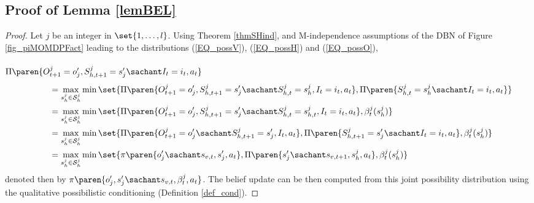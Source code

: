 \subsection{Proof of Lemma \ref{lemBEL}}
\label{lemBEL_RETURN}
\begin{proof}
Let $j$ be an integer in $\set{1,\ldots,l}$. 
Using Theorem \ref{thmSHind}, and M-independence assumptions of the DBN of Figure \ref{fig_piMOMDPFact}
leading to the distributions (\ref{EQ_possV}), (\ref{EQ_possH}) and (\ref{EQ_possO}),\\
\\
$\Pi \paren{O_{t+1}^j = o_j' , S_{h,t+1}^j = s_j' \sachant I_t = i_t, a_t  }$
\begin{align*}
\hspace{1cm} &= \max_{s^j_h \in \mathcal{S}^j_h} \min \set{ \Pi \paren{ O_{t+1}^j = o_j', S_{h,t+1}^j = s_j' \sachant S^j_{h,t} =  s^j_h, I_t=i_t, a_t  }, \Pi \paren{ S^j_{h,t}=s^j_h \sachant I_t=i_t, a_t } } \\
&= \max_{s^j_h \in \mathcal{S}^j_h} \min \set{  \Pi \paren{ O_{t+1}^j = o_j', S_{h,t+1}^j = s_j' \sachant S^j_{h,t} =  s^j_{h,t}, I_t=i_t, a_t  }, \beta^j_t(s^j_h) } \\ 
&= \max_{s^j_h \in \mathcal{S}^j_h} \min \set{  \Pi \paren{ O_{t+1}^j = o_j' \sachant  S^j_{h,t+1} =  s_j', I_t, a_t  },
\Pi \paren{ S^j_{h,t+1} =  s_j' \sachant I_t=i_t, a_t  } , \beta^j_t(s^j_h) } \\ 
&= \max_{s^j_h \in \mathcal{S}^j_h} \min \set{  \pi \paren{ o_j' \sachant  s_{v,t}, s_j', a_t  },
\Pi \paren{ s_j' \sachant s_{v,t+1}, s^j_h, a_t  } , \beta^j_t(s^j_h) } 
\end{align*}
denoted then by $\pi \paren{o_j',s_j' \sachant s_{v,t}, \beta^j_t, a_t  }$.
The belief update can be then computed from this joint possibility distribution
using the qualitative possibilistic conditioning (Definition \ref{def_cond}).
\end{proof}

